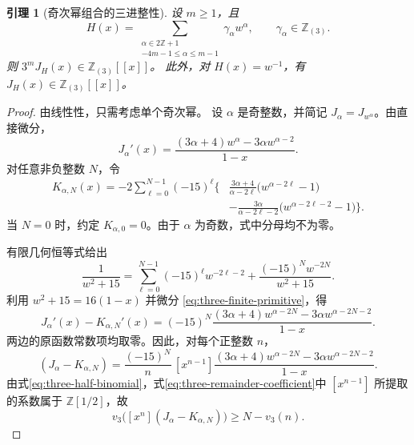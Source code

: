 \documentclass[a4paper,11pt]{article}
\numberwithin{equation}{section}
\theoremstyle{chinese}
\newtheorem{lemma}{引理}[section]
\newcommand{\Z}{\mathbb Z}
\begin{document}
\begin{lemma}[奇次幂组合的三进整性]\label{lem:odd-integrality}
设 $m\ge1$，且
\[
H(x)=\sum_{\substack{\alpha\in2\Z+1\\-4m-1\le\alpha\le m-1}}
\gamma_\alpha w^\alpha,\qquad \gamma_\alpha\in\Z_{(3)}.
\]
则 $3^mJ_H(x)\in\Z_{(3)}[[x]]$。
此外，对 $H(x)=w^{-1}$，有 $J_H(x)\in\Z_{(3)}[[x]]$。
\end{lemma}
\begin{proof}
由线性性，只需考虑单个奇次幂。
设 \(\alpha\) 是奇整数，并简记 \(J_\alpha=J_{w^\alpha}\)。由直接微分，
\begin{equation}
J_\alpha'(x)=
\frac{(3\alpha +4)w^\alpha-3\alpha w^{\alpha-2}}{1-x}.
\label{eq:three-primitive-derivative}
\end{equation}
对任意非负整数 \(N\)，令
\begin{equation}
\begin{aligned}
K_{\alpha,N}(x)=-2\sum_{\ell=0}^{N-1}(-15)^\ell\Biggl\{&
\frac{3\alpha +4}{\alpha-2\ell}\bigl(w^{\alpha-2\ell}-1\bigr)\\
&-\frac{3\alpha }{\alpha-2\ell-2}\bigl(w^{\alpha-2\ell-2}-1\bigr)
\Biggr\}.
\end{aligned}
\label{eq:three-finite-primitive}
\end{equation}
当 \(N=0\) 时，约定 \(K_{\alpha,0}=0\)。由于 \(\alpha\) 为奇数，式中分母均不为零。

有限几何恒等式给出
\begin{equation}
\frac{1}{w^2+15}
=\sum_{\ell=0}^{N-1}(-15)^\ell w^{-2\ell-2}
+\frac{(-15)^N w^{-2N}}{w^2+15}.
\label{eq:three-finite-geometric}
\end{equation}
利用 \(w^2+15=16(1-x)\) 并微分
\eqref{eq:three-finite-primitive}，得
\begin{equation}
J_\alpha'(x)-K_{\alpha,N}'(x)
=(-15)^N
\frac{(3\alpha +4)w^{\alpha-2N}-3\alpha w^{\alpha-2N-2}}{1-x}.
\label{eq:three-remainder-derivative}
\end{equation}
两边的原函数常数项均取零。因此，对每个正整数 \(n\)，
\begin{equation}
[x^n](J_\alpha-K_{\alpha,N})
=\frac{(-15)^N}{n}\,[x^{n-1}]
\frac{(3\alpha +4)w^{\alpha-2N}-3\alpha w^{\alpha-2N-2}}{1-x}.
\label{eq:three-remainder-coefficient}
\end{equation}
由式\eqref{eq:three-half-binomial}，式\eqref{eq:three-remainder-coefficient}中
\([x^{n-1}]\) 所提取的系数属于 \(\mathbb Z[1/2]\)，故
\begin{equation}
v_3\bigl([x^n](J_\alpha-K_{\alpha,N})\bigr)\ge N-v_3(n).
\label{eq:three-remainder-valuation}
\end{equation}


\end{proof}
\end{document}
